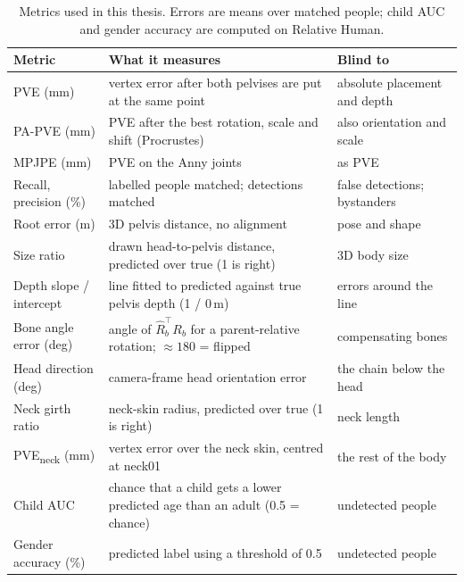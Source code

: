 \begin{table}[!htb]
\centering\footnotesize
\setlength{\tabcolsep}{3pt}
\begin{tabular}{@{}>{\raggedright}p{2.6cm}>{\raggedright}p{6.4cm}>{\raggedright\arraybackslash}p{3.4cm}@{}}
\toprule
Metric & What it measures & Blind to \\
\midrule
PVE (mm) & vertex error after both pelvises are put at the same point & absolute placement and depth \\
PA-PVE (mm) & PVE after the best rotation, scale and shift (Procrustes) & also orientation and scale \\
MPJPE (mm) & PVE on the \MethodNumBones{} Anny joints & as PVE \\
Recall, precision (\%) & labelled people matched; detections matched & false detections; bystanders \\
Root error (m) & 3D pelvis distance, no alignment & pose and shape \\
Size ratio & drawn head-to-pelvis distance, predicted over true (1 is right) & 3D body size \\
Depth slope / intercept & line fitted to predicted against true pelvis depth (1 / 0\,m) & errors around the line \\
Bone angle error (deg) & angle of $\hat{R}_b^{\top}R_b$ for a parent-relative rotation; ${\approx}180$ = flipped & compensating bones \\
Head direction (deg) & camera-frame head orientation error & the chain below the head \\
Neck girth ratio & neck-skin radius, predicted over true (1 is right) & neck length \\
PVE\textsubscript{neck} (mm) & vertex error over the neck skin, centred at neck01 & the rest of the body \\
Child AUC & chance that a child gets a lower predicted age than an adult (0.5 = chance) & undetected people \\
Gender accuracy (\%) & predicted label using a threshold of 0.5 & undetected people \\
\bottomrule
\end{tabular}
\caption[Metrics]{Metrics used in this thesis. Errors are means over matched people; child AUC and gender
accuracy are computed on Relative Human.}
\label{tab:metrics}
\end{table}
